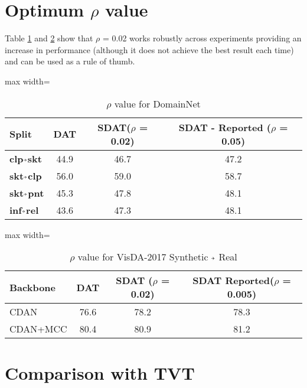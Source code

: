 \documentclass[table,dvipsnames]{article}
\newcommand{\veryshortarrow}[1][3pt]{\mathrel{\hbox{\rule[\dimexpr\fontdimen22\textfont2-.2pt\relax]{#1}{.4pt}}\mkern-4mu\hbox{\usefont{U}{lasy}{m}{n}\symbol{41}}}} \newcommand{\cmark}{\ding{51}}\newcommand{\xmark}{\ding{55}}\usepackage{amssymb}\usepackage{pifont}\usepackage[hyphens]{url}
\theoremstyle{plain}
\theoremstyle{definition}
\theoremstyle{remark}
\begin{document}
\section{
{Optimum $\rho$ value}}
\label{app:opt_rho}
Table \ref{tab:rho_domainnet} and \ref{tab:rho_visda} show that $\rho$ = 0.02 works robustly across experiments providing an increase in performance (although it does not achieve the best result each time) and can be used as a rule of thumb.
\begin{table*}[h!]
    \centering
    \caption{{$\rho$ value for DomainNet}}
    \vskip 0.15in
     \begin{adjustbox}{max width=\columnwidth}
    \begin{tabular}{l|ccc}
    \hline
    {Split} & DAT &  SDAT($\rho$ = 0.02) & SDAT - Reported ($\rho$ = 0.05) \\
\hline \hline
    \textbf{clp$\veryshortarrow$skt } & 44.9 & 46.7 & 47.2\\
    
     \textbf{skt$\veryshortarrow$clp} & 56.0 & 59.0 & 58.7 \\
      \textbf{skt$\veryshortarrow$pnt} & 45.3 & 47.8 & 48.1 \\
       \textbf{inf$\veryshortarrow$rel} & 43.6 & 47.3 & 48.1\\
\end{tabular}
    
    \label{tab:rho_domainnet}
    \end{adjustbox}
\end{table*}
\begin{table*}[h!]
    \centering
    \caption{{$\rho$ value for VisDA-2017 Synthetic $\veryshortarrow$ Real} }
    \vskip 0.15in
     \begin{adjustbox}{max width=\columnwidth}
    \begin{tabular}{l|ccc}
    \hline
    {Backbone} & DAT &  SDAT ($\rho$ = 0.02) & SDAT Reported($\rho$ = 0.005)\\
\hline \hline
    {CDAN} & 76.6 & 78.2 & 78.3\\
     {CDAN+MCC} & 80.4 & 80.9 & 81.2\\
    \end{tabular}
    
    \label{tab:rho_visda}
    \end{adjustbox}
\end{table*}

\section{
{Comparison with TVT}}
\label{app:comp_tvt}
\end{document}
